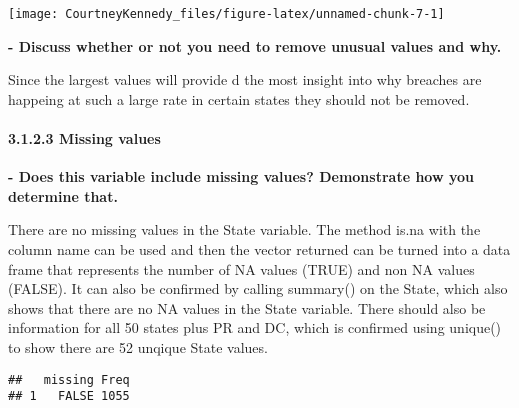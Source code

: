 \documentclass[
]{article}
\newenvironment{Shaded}{\begin{snugshade}}{\end{snugshade}}
\newcommand{\FunctionTok}[1]{\textcolor[rgb]{0.00,0.00,0.00}{#1}}
\newcommand{\NormalTok}[1]{#1}
\newcommand{\OtherTok}[1]{\textcolor[rgb]{0.56,0.35,0.01}{#1}}
\newcommand{\SpecialCharTok}[1]{\textcolor[rgb]{0.00,0.00,0.00}{#1}}
\begin{document}
\begin{center}\texttt{[image: CourtneyKennedy\_files/figure-latex/unnamed-chunk-7-1]} \end{center}

\textbf{- Discuss whether or not you need to remove unusual values and
why.}

Since the largest values will provide d the most insight into why
breaches are happeing at such a large rate in certain states they should
not be removed.

\hypertarget{missing-values}{%
\paragraph{3.1.2.3 Missing values}\label{missing-values}}

\textbf{- Does this variable include missing values? Demonstrate how you
determine that.}

There are no missing values in the State variable. The method is.na with
the column name can be used and then the vector returned can be turned
into a data frame that represents the number of NA values (TRUE) and non
NA values (FALSE). It can also be confirmed by calling summary() on the
State, which also shows that there are no NA values in the State
variable. There should also be information for all 50 states plus PR and
DC, which is confirmed using unique() to show there are 52 unqique State
values.

\begin{Shaded}
\end{Shaded}

\begin{verbatim}
##   missing Freq
## 1   FALSE 1055
\end{verbatim}

\begin{Shaded}
\end{Shaded}
\end{document}
